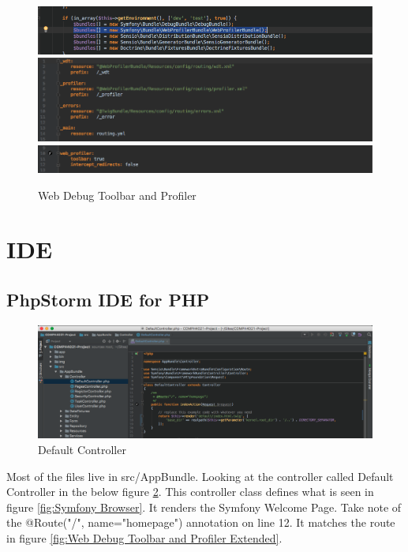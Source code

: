 \begin{figure}[htbp]
   \centering
   \includegraphics[width=400pt]{figures/AppKernel.png}
   \includegraphics[width=400pt]{figures/routing_dev.png}
   \includegraphics[width=400pt]{figures/config_dev.png} %
   \caption{Web Debug Toolbar and Profiler}
   \label{fig:Web Debug Toolbar and Profiler}
\end{figure}

\section{IDE}

\subsection{PhpStorm IDE for PHP}

\begin{figure}[htbp]
   \centering
   \includegraphics[width=400pt]{figures/default_controller.png} %
   \caption{Default Controller}
   \label{fig:Default Controller}
\end{figure}

Most of the files live in src/AppBundle. Looking at the controller called Default Controller in the below figure \ref{fig:Default Controller}. This controller class defines what is seen in figure \ref{fig:Symfony Browser}. It renders the Symfony Welcome Page. Take note of the @Route("/", name="homepage") annotation on line 12. It matches the route in figure \ref{fig:Web Debug Toolbar and Profiler Extended}.













